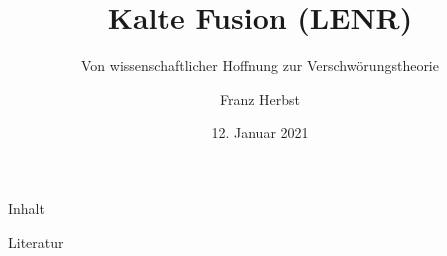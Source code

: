 \documentclass[handout, 10pt, aspectratio=43]{beamer}
\title{Kalte Fusion (LENR)} %
\subtitle{Von wissenschaftlicher Hoffnung zur Verschwörungstheorie}
\author{Franz Herbst}
\institute[Universität Konstanz]{
    Im Rahmen der Vorlesung Kern- und Teilchenphysik \\
    Universität Konstanz
} %
\date{12. Januar 2021}
\begin{document}
    \RaggedRight
    \frame{\titlepage}
    
    \begin{frame}{Inhalt}
        \tableofcontents
    \end{frame}
    
    
    
    
    

    \begin{frame}[allowframebreaks]{Literatur}
        
        
    \end{frame}
\end{document}
